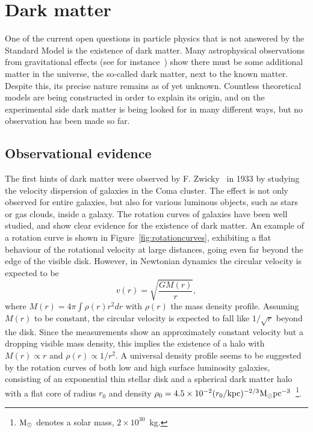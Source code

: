\section{Dark matter}
\label{sec:DM}

One of the current open questions in particle physics that is not answered by the Standard Model is the existence of dark matter. Many astrophysical observations from gravitational effects (see for instance~\cite{Bertone:2004pz}) show there must be some additional matter in the universe, the so-called dark matter, next to the known matter. Despite this, its precise nature remains as of yet unknown. Countless theoretical models are being constructed in order to explain its origin, and on the experimental side dark matter is being looked for in many different ways, but no observation has been made so far.

\subsection{Observational evidence}

The first hints of dark matter were observed by F. Zwicky~\cite{Zwicky:1933gu} in 1933 by studying the velocity dispersion of galaxies in the Coma cluster. The effect is not only observed for entire galaxies, but also for various luminous objects, such as stars or gas clouds, inside a galaxy. The rotation curves of galaxies have been well studied, and show clear evidence for the existence of dark matter. An example of a rotation curve is shown in Figure~\ref{fig:rotationcurves}, exhibiting a flat behaviour of the rotational velocity at large distances, going even far beyond the edge of the visible disk. However, in Newtonian dynamics the circular velocity is expected to be
\begin{equation}
 v(r) = \sqrt{\frac{GM(r)}{r}},
\end{equation}
where $M(r) = 4\pi\int\rho(r)r^2dr$ with $\rho(r)$ the mass density profile. Assuming $M(r)$ to be constant, the circular velocity is expected to fall like $1/\sqrt{r}$ beyond the disk. Since the measurements show an approximately constant velocity but a dropping visible mass density, this implies the existence of a halo with $M(r) \propto r$ and $\rho(r)\propto1/r^2$. A universal density profile seems to be suggested by the rotation curves of both low and high surface luminosity galaxies, consisting of an exponential thin stellar disk and a spherical dark matter halo with a flat core of radius $r_0$ and density $\rho_0 = 4.5\times 10^{-2}(r_0/\textup{kpc})^{-2/3}\textup{M}_\odot\textup{pc}^{-3}$~\cite{Salucci:2002jg}\footnote{$\textup{M}_\odot$ denotes a solar mass, $2 \times 10^{30}$~kg.}.

